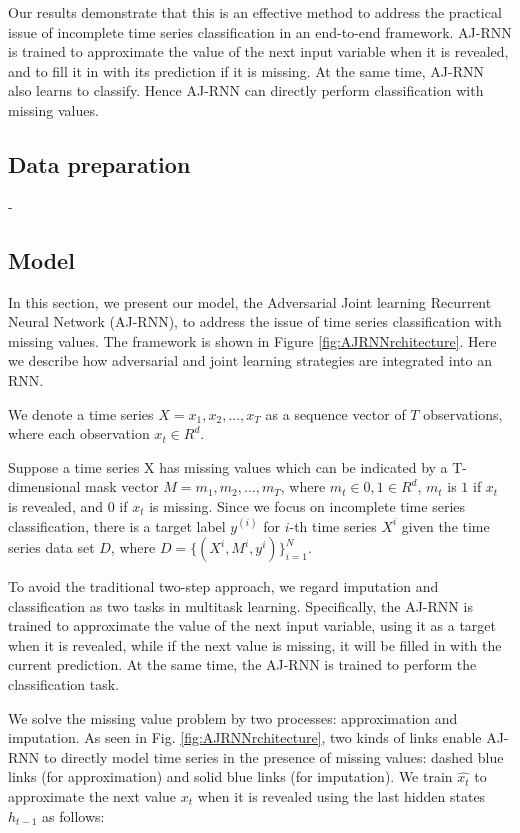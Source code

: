 Our results demonstrate that this is an effective method to address the practical issue of incomplete time series classification in an end-to-end framework.
AJ-RNN is trained to approximate the value of the next input variable when it is revealed, and to fill it in with its prediction if it is missing. 
At the same time, AJ-RNN also learns to classify.
Hence AJ-RNN can directly perform classification with missing values.

\subsection{Data preparation}
- 

\subsection{Model}


In this section, we present our model, the Adversarial Joint learning Recurrent Neural Network (AJ-RNN), to address the issue of time series classification with missing values.
The framework is shown in Figure \ref{fig:AJRNNrchitecture}. Here we describe how adversarial and joint learning strategies are integrated into an RNN.

We denote a time series $X = {x_1, x_2, ..., x_T }$ as a sequence vector of $T$ observations, where each observation $x_t \in R^d$.

Suppose a time series X has missing values
which can be indicated by a T-dimensional mask vector
$M = {m_1, m_2, ..., m_T}$, where $m_t \in {0, 1} \in R^d$, $m_t$ is $1$ if $x_t$ is revealed, and $0$ if $x_t$ is missing. 
Since we focus on incomplete time series classification, there is a target label $y^{(i)}$ for $i$-th time series $X^i$ given the time series data set $D$,
where $D = \{(X^i,M^i, y^i)\}^N_{i=1}$.

To avoid the traditional two-step approach, we regard imputation and classification as two tasks in multitask learning.
Specifically, the AJ-RNN is trained to approximate the value of the next input variable, using it as a target when it is revealed, while if the next value is missing, it will be filled in with the current prediction. 
At the same time, the AJ-RNN is trained to perform the classification task.

We solve the missing value problem by two processes: approximation and imputation. 
As seen in Fig. \ref{fig:AJRNNrchitecture}, two kinds of links enable AJ-RNN to directly model time series in the presence of missing values: dashed blue links (for approximation) and solid blue links (for imputation). 
We train $\hat{x_t}$ to approximate the next value $x_t$ when it is revealed using the last hidden states $h_{t-1}$ as follows:

